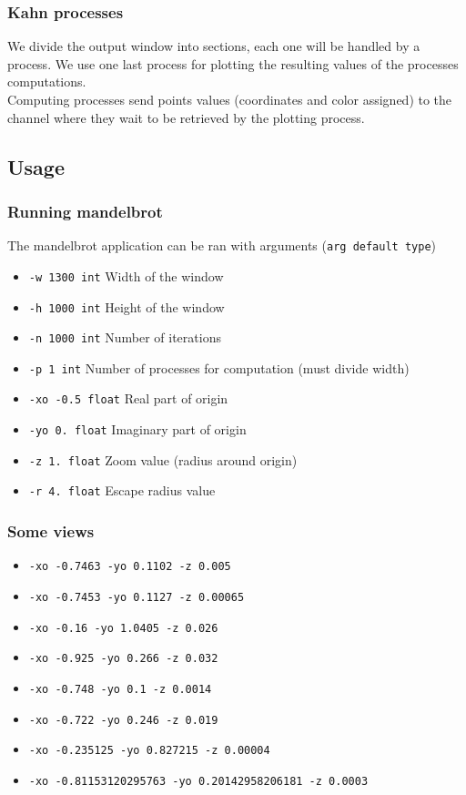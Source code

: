 \documentclass{article}
\begin{document}
\subsubsection{Kahn processes}
We divide the output window into sections, each one will be handled by a process. We use one last process for plotting the resulting values of the processes computations.\\
Computing processes send points values (coordinates and color assigned) to the channel where they wait to be retrieved by the plotting process.

\subsection{Usage}
\subsubsection{Running mandelbrot}
The mandelbrot application can be ran with arguments (\texttt{arg default type})
\begin{itemize}[label={}]
	\item \texttt{-w 1300 int} Width of the window
	\item \texttt{-h 1000 int} Height of the window
	\item \texttt{-n 1000 int} Number of iterations
	\item \texttt{-p 1 int} Number of processes for computation (must divide width)
	\item \texttt{-xo -0.5 float} Real part of origin
	\item \texttt{-yo 0. float} Imaginary part of origin
	\item \texttt{-z 1. float} Zoom value (radius around origin)
	\item \texttt{-r 4. float} Escape radius value 
	
\end{itemize}

\subsubsection{Some views}
\begin{itemize}[label={}]
	\item \texttt{-xo -0.7463 -yo 0.1102 -z 0.005}
	\item \texttt{-xo -0.7453 -yo 0.1127 -z 0.00065}
	\item \texttt{-xo -0.16 -yo 1.0405 -z 0.026}
	\item \texttt{-xo -0.925 -yo 0.266 -z 0.032}
	\item \texttt{-xo -0.748 -yo 0.1 -z 0.0014}
	\item \texttt{-xo -0.722 -yo 0.246 -z 0.019}
	\item \texttt{-xo -0.235125 -yo 0.827215 -z 0.00004}
	\item \texttt{-xo -0.81153120295763 -yo 0.20142958206181 -z 0.0003}
	
\end{itemize}
\end{document}
